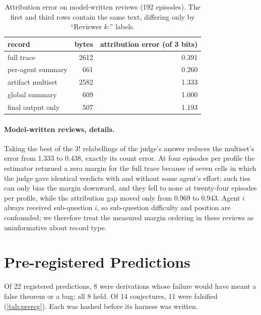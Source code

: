 \documentclass[sigconf,anonymous,acmthm=false]{acmart}
\theoremstyle{acmplain}
\theoremstyle{acmdefinition}
\begin{document}
\begin{table}[h]
\caption{Attribution error on model-written reviews (192 episodes). The first and third rows
contain the same text, differing only by ``Reviewer $k$:'' labels.}
\label{tab:llm}
\footnotesize
\begin{tabular}{@{}lrr@{}}
\toprule
record & bytes & attribution error (of 3 bits)\\
\midrule
full trace & 2612 & 0.391\\
per-agent summary & 661 & 0.260\\
artifact multiset & 2582 & 1.333\\
global summary & 609 & 1.000\\
final output only & 507 & 1.193\\
\bottomrule
\end{tabular}
\end{table}

\paragraph{Model-written reviews, details.} Taking the best of the $3!$ relabellings of the
judge's answer reduces the multiset's error from 1.333 to 0.438, exactly its count error.
At four episodes per profile the estimator returned a zero margin for the full trace because
of seven cells in which the judge gave identical verdicts with and without some agent's
effort; such ties can only bias the margin downward, and they fell to none at twenty-four
episodes per profile, while the attribution gap moved only from 0.969 to 0.943. Agent $i$
always received sub-question $i$, so sub-question difficulty and position are confounded;
we therefore treat the measured margin ordering in these reviews as uninformative about
record type.

\section{Pre-registered Predictions}
Of 22 registered predictions, 8 were derivations whose failure would have meant a false
theorem or a bug; all 8 held. Of 14 conjectures, 11 were falsified (\cref{tab:prereg}). Each
was hashed before its harness was written.
\end{document}
